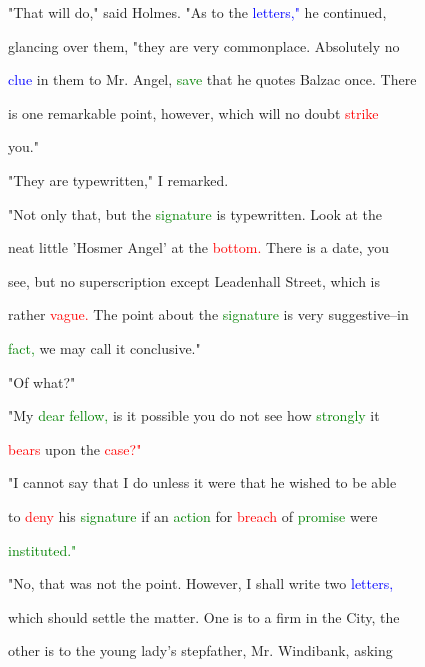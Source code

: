  "That will do," said Holmes. "As to the \textcolor{blue}{letters,"} he continued,

 glancing over them, "they are very \textcolor{BurntOrange}{commonplace.} Absolutely no

 \textcolor{blue}{clue} in them to Mr. \textcolor{BurntOrange}{Angel,} \textcolor{green}{save} that he \textcolor{BurntOrange}{quotes} Balzac once. There

 is one \textcolor{BurntOrange}{remarkable} point, however, which will no \textcolor{BurntOrange}{doubt} \textcolor{red}{strike}

 you."



 "They are typewritten," I remarked.



 "Not only that, but the \textcolor{green}{signature} is typewritten. Look at the

 neat little 'Hosmer \textcolor{BurntOrange}{Angel'} at the \textcolor{red}{bottom.} There is a date, you

 see, but no superscription except Leadenhall Street, which is

 rather \textcolor{red}{vague.} The point about the \textcolor{green}{signature} is very suggestive--in

 \textcolor{green}{fact,} we may call it conclusive."



 "Of what?"



 "My \textcolor{green}{dear} \textcolor{green}{fellow,} is it possible you do not see how \textcolor{green}{strongly} it

 \textcolor{red}{bears} upon the \textcolor{red}{case?"}



 "I cannot say that I do unless it were that he wished to be able

 to \textcolor{red}{deny} his \textcolor{green}{signature} if an \textcolor{green}{action} for \textcolor{red}{breach} of \textcolor{green}{promise} were

 \textcolor{green}{instituted."}



 "No, that was not the point. However, I shall write two \textcolor{blue}{letters,}

 which should settle the matter. One is to a firm in the City, the

 other is to the \textcolor{BurntOrange}{young} lady's stepfather, Mr. Windibank, asking

